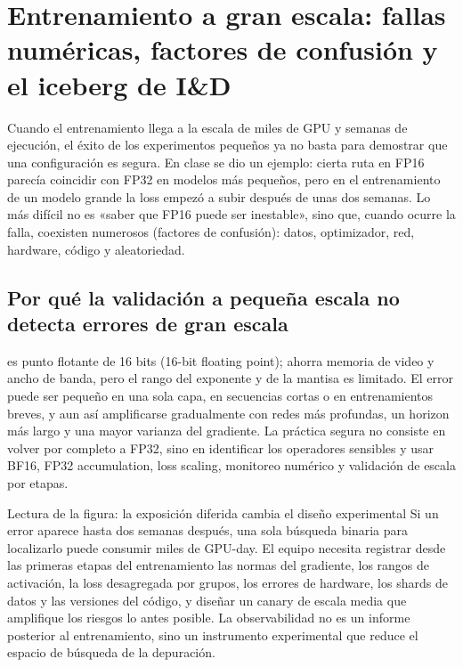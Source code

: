 \section{Entrenamiento a gran escala: fallas numéricas, factores de confusión y el iceberg de I\&D}

Cuando el entrenamiento llega a la escala de miles de GPU y semanas de ejecución, el éxito de los experimentos pequeños ya no basta para demostrar que una configuración es segura. En clase se dio un ejemplo: cierta ruta en FP16 parecía coincidir con FP32 en modelos más pequeños, pero en el entrenamiento de un modelo grande la loss empezó a subir después de unas dos semanas. Lo más difícil no es «saber que FP16 puede ser inestable», sino que, cuando ocurre la falla, coexisten numerosos  (factores de confusión): datos, optimizador, red, hardware, código y aleatoriedad.

\subsection{Por qué la validación a pequeña escala no detecta errores de gran escala}

 es punto flotante de 16 bits (16-bit floating point); ahorra memoria de video y ancho de banda, pero el rango del exponente y de la mantisa es limitado. El error puede ser pequeño en una sola capa, en secuencias cortas o en entrenamientos breves, y aun así amplificarse gradualmente con redes más profundas, un horizon más largo y una mayor varianza del gradiente. La práctica segura no consiste en volver por completo a FP32, sino en identificar los operadores sensibles y usar BF16, FP32 accumulation, loss scaling, monitoreo numérico y validación de escala por etapas.


\begin{knowledgebox}{Lectura de la figura: la exposición diferida cambia el diseño experimental}
Si un error aparece hasta dos semanas después, una sola búsqueda binaria para localizarlo puede consumir miles de GPU-day. El equipo necesita registrar desde las primeras etapas del entrenamiento las normas del gradiente, los rangos de activación, la loss desagregada por grupos, los errores de hardware, los shards de datos y las versiones del código, y diseñar un canary de escala media que amplifique los riesgos lo antes posible. La observabilidad no es un informe posterior al entrenamiento, sino un instrumento experimental que reduce el espacio de búsqueda de la depuración.
\end{knowledgebox}


